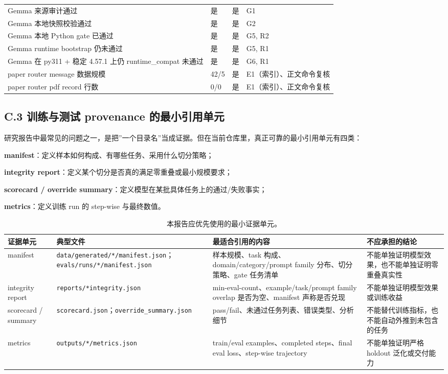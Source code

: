 \documentclass[11pt,a4paper]{article}
\newcommand{\code}[1]{\begingroup\ttfamily\footnotesize\nolinkurl{#1}\endgroup}
\begin{document}
\begin{longtable}{p{3.8cm} p{2.2cm} p{1.4cm} p{4.8cm}}
Gemma 来源审计通过 & 是 & 是 & G1 \\
Gemma 本地快照校验通过 & 是 & 是 & G2 \\
Gemma 本地 Python gate 已通过 & 是 & 是 & G5, R2 \\
Gemma runtime bootstrap 仍未通过 & 是 & 是 & G5, R1 \\
Gemma 在 py311 + 稳定 4.57.1 上仍 runtime\_compat 未通过 & 是 & 是 & G6, R1 \\
paper router message 数据规模 & 42/5 & 是 & E1（索引）、正文命令复核 \\
paper router pdf record 行数 & 0/0 & 是 & E1（索引）、正文命令复核 \\
\bottomrule
\end{longtable}
\normalsize

\subsection{C.3 训练与测试 provenance 的最小引用单元}

研究报告中最常见的问题之一，是把”一个目录名”当成证据。但在当前仓库里，真正可靠的最小引用单元有四类：

  \par \textbf{manifest}：定义样本如何构成、有哪些任务、采用什么切分策略；
  \par \textbf{integrity report}：定义某个切分是否真的满足零重叠或最小规模要求；
  \par \textbf{scorecard / override summary}：定义模型在某批具体任务上的通过/失败事实；
  \par \textbf{metrics}：定义训练 run 的 step-wise 与最终数值。


\begin{table}[htbp]
\centering
\small
\begin{tabularx}{\textwidth}{p{2.1cm} p{3.7cm} p{1.9cm} Y}
\toprule
证据单元 & 典型文件 & 最适合引用的内容 & 不应承担的结论 \\
\midrule
manifest & \code{data/generated/*/manifest.json}；\code{evals/runs/*/manifest.json} & 样本规模、task 构成、domain/category/prompt family 分布、切分策略、gate 任务清单 & 不能单独证明模型效果，也不能单独证明零重叠真实性 \\
integrity report & \code{reports/*integrity.json} & min-eval-count、example/task/prompt family overlap 是否为空、manifest 声称是否兑现 & 不能单独证明模型效果或训练收益 \\
scorecard / summary & \code{scorecard.json}；\code{override\_summary.json} & pass/fail、未通过任务列表、错误类型、分析细节 & 不能替代训练指标，也不能自动外推到未包含的任务 \\
metrics & \code{outputs/*/metrics.json} & train/eval examples、completed steps、final eval loss、step-wise trajectory & 不能单独证明严格 holdout 泛化或交付能力 \\
\bottomrule
\end{tabularx}
\caption{本报告应优先使用的最小证据单元。}
\label{tab:minimum-evidence-unit}
\end{table}
\end{document}
